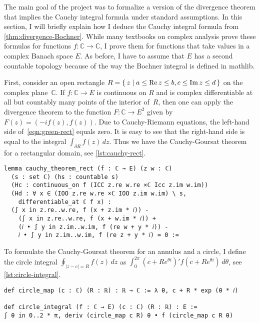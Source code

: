 \documentclass[a4paper, UKenglish,cleveref, autoref, thm-restate]{lipics-v2021}
\newcommand{\bbC}{\mathbb{C}}
\begin{document}
The main goal of the project was to formalize a version of the
divergence theorem that implies the Cauchy integral formula under
standard assumptions. In this section, I will briefly explain how I
deduce the Cauchy integral formula from
\autoref{thm:divergence-Bochner}. While many textbooks on complex
analysis prove these formulas for functions \(f\colon \bbC\to \bbC\), I
prove them for functions that take values in a complex Banach space
\(E\). As before, I have to assume that \(E\) has a second countable
topology because of the way the Bochner integral is defined in
mathlib.

First, consider an open rectangle
\(R=\set{z|a\le \operatorname{Re}z\le b,c\le \operatorname{Im}z\le d}\) on the complex
plane~\(\bbC\). If \(f\colon \bbC\to E\) is continuous on \(R\) and is
complex differentiable at all but countably many points of the
interior of~\(R\), then one can apply the divergence theorem to the
function \(F\colon \bbC \to E^{2}\) given by \(F(z)=(-if(z),
f(z))\). Due to Cauchy-Riemann equations, the left-hand side
of~\eqref{eqn:green-rect} equals zero. It is easy to see that the
right-hand side is equal to the integral
\(\int_{\partial R}f(z)\,dz\). Thus we have the Cauchy-Goursat theorem
for a rectangular domain, see \autoref{lst:cauchy-rect}.

\begin{lstlisting}[caption={The Cauchy-Goursat theorem for a rectangle},label=lst:cauchy-rect]
lemma cauchy_theorem_rect (f : ℂ → E) (z w : ℂ)
  (s : set ℂ) (hs : countable s)
  (Hc : continuous_on f (ICC z.re w.re ×ℂ Icc z.im w.im))
  (Hd : ∀ x ∈ (IOO z.re w.re ×ℂ IOO z.im w.im) \ s,
    differentiable_at ℂ f x) :
  (∫ x in z.re..w.re, f (x + z.im * 𝑖)) -
    (∫ x in z.re..w.re, f (x + w.im * 𝑖)) +
    (𝑖 • ∫ y in z.im..w.im, f (re w + y * 𝑖)) -
    𝑖 • ∫ y in z.im..w.im, f (re z + y * 𝑖) = 0 :=
\end{lstlisting}

To formulate the Cauchy-Goursat theorem for an annulus and a circle, I
define the circle integral \(\oint_{|z-c|=R}f(z)\,dz\) as
\(\int_{0}^{2\pi}(c+Re^{\theta i})'f(c+Re^{\theta i})\,d\theta\), see
\autoref{lst:circle-integral}.

\begin{lstlisting}[caption=Definition of the circle integral \(\oint_{|z-c|=R}f(z)\,dz\),label=lst:circle-integral]
def circle_map (c : ℂ) (R : ℝ) : ℝ → ℂ := λ θ, c + R * exp (θ * 𝑖)

def circle_integral (f : ℂ → E) (c : ℂ) (R : ℝ) : E :=
∫ θ in 0..2 * π, deriv (circle_map c R) θ • f (circle_map c R θ)
\end{lstlisting}
\end{document}
